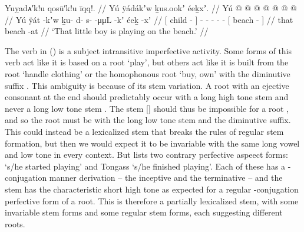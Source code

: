 \ex\label{ex:100-3-play-on-beach}%
%
\begingl
	\glpreamble	Yuỵadᴀ′k!u qosū′k!u īqq!. //
	\glpreamble	Yú ÿádákʼw ḵus.ookʼ éeḵxʼ. //
	\gla	{} Yú  @ {} {}  @ {} @ {} @ {} @ {} @ {} {}  @ {} {} //
	\glb	{} Yú ÿát -kʼw {} ḵu- d- s-  -μμL -kʼ {} éeḵ -xʼ {} //
	\glc	{}[  child - {}]
			- - -  - -
			{}[ beach - {}] //
	\gld	{} that  {} {}  {} {} {} {} {}
			{} beach -at {} //
	\glft	‘That little boy is playing on the beach.’
		//
\endgl
\xe

The verb  in (\lastx) is a subject intransitive imperfective activity.
Some forms of this verb act like it is based on a root  ‘play’, but others act like it is built from the root  ‘handle clothing’ or the homophonous root  ‘buy, own’ with the diminutive suffix .
This ambiguity is because of its stem variation.
A  root with an ejective consonant at the end should predictably occur with a long high tone stem  and never a long low tone stem .
The stem  [] should thus be impossible for a root , and so the root must be  with the long low tone  stem and the  diminutive suffix.
This could instead be a lexicalized stem that breaks the rules of regular stem formation, but then we would expect it to be invariable with the same long vowel and low tone in every context.
But \textcite[02/352]{leer:1973} lists two contrary perfective aspeect forms:  ‘s/he started playing’ and Tongass  ‘s/he finished playing’.
Each of these has a -conjugation manner derivation – 
the inceptive 
and the terminative 
– and the stem has the characteristic short high tone  as expected for a regular -conjugation perfective form of a  root.
This is therefore a partially lexicalized stem, with some invariable stem forms and some regular stem forms, each suggesting different roots.

